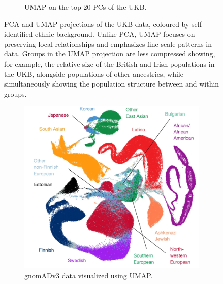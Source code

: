 \documentclass[12pt]{article}
\newcommand{\rulesep}{\unskip\ \vrule\ }
\begin{document}
\begin{figure}[h!]
\begin{subfigure}[b]{0.49\linewidth}
    \caption{UMAP on the top 20 PCs of the UKB.}
    \label{fig:UKB_UMAP}
  \end{subfigure}
  \caption{PCA and UMAP projections of the UKB data, coloured by self-identified ethnic background. Unlike PCA, UMAP focuses on preserving local relationships and emphasizes fine-scale patterns in data. Groups in the UMAP projection are less compressed showing, for example, the relative size of the British and Irish populations in the UKB, alongside populations of other ancestries, while simultaneously showing the population structure between and within groups.}
  \label{fig:UKB}
\end{figure}

\clearpage

\begin{figure}[h!]
  \centering
  \begin{subfigure}[b]{0.49\linewidth}
    \includegraphics[width=\linewidth]{external_images/gnomAD_umap.png}
    \caption{gnomADv3 data visualized using UMAP.}
    \label{fig:gnomAD_UMAP}
  \end{subfigure}
  \rulesep
  \begin{subfigure}[b]{0.49\linewidth}

\end{subfigure}
\end{figure}
\end{document}

